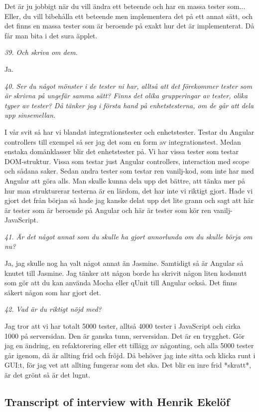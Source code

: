 \documentclass[11pt]{article}
\begin{document}
Det är ju jobbigt när du vill ändra ett beteende och har en massa tester som... Eller, du vill bibehålla ett beteende men implementera det på ett annat sätt, och det finns en massa tester som är beroende på exakt hur det är implementerat. Då får man bita i det sura äpplet.

\emph{39. Och skriva om dem.}

Ja.

\emph{40. Ser du något mönster i de tester ni har, alltså att det förekommer tester som är skrivna på ungefär samma sätt? Finns det olika grupperingar av tester, olika typer av tester? Då tänker jag i första hand på enhetstesterna, om de går att dela upp sinsemellan.}

I vår svit så har vi blandat integrationstester och enhetstester. Testar du Angular controllers till exempel så ser jag det som en form av integrationstest. Medan enstaka domänklasser blir det enhetstester på. Vi har vissa tester som testar DOM-struktur. Vissa som testar just Angular controllers, interaction med scope och sådana saker. Sedan andra tester som testar ren vanilj-kod, som inte har med Angular att göra alls. Man skulle kunna dela upp det bättre, att tänka mer på hur man strukturerar testerna är en lärdom, det har inte vi riktigt gjort. Hade vi gjort det från början så hade jag kanske delat upp det lite grann och sagt att här är tester som är beroende på Angular och här är tester som kör ren vanilj-JavaScript.

\emph{41. Är det något annat som du skulle ha gjort annorlunda om du skulle börja om nu?}

Ja, jag skulle nog ha valt något annat än Jasmine. Samtidigt så är Angular så knutet till Jasmine. Jag tänker att någon borde ha skrivit någon liten kodsnutt som gör att du kan använda Mocha eller qUnit till Angular också. Det finns säkert någon som har gjort det.

\emph{42. Vad är du riktigt nöjd med?}

Jag tror att vi har totalt 5000 tester, alltså 4000 tester i JavaScript och cirka 1000 på serversidan. Den är ganska tunn, serversidan. Det är en trygghet. Gör jag en ändring, en refaktorering eller ett tillägg av någonting, och alla 5000 tester går igenom, då är allting frid och fröjd. Då behöver jag inte sitta och klicka runt i GUI:t, för jag vet att allting fungerar som det ska. Det blir en inre frid *skratt*, är det grönt så är det lugnt.


\subsection*{Transcript of interview with Henrik Ekelöf}
\end{document}
